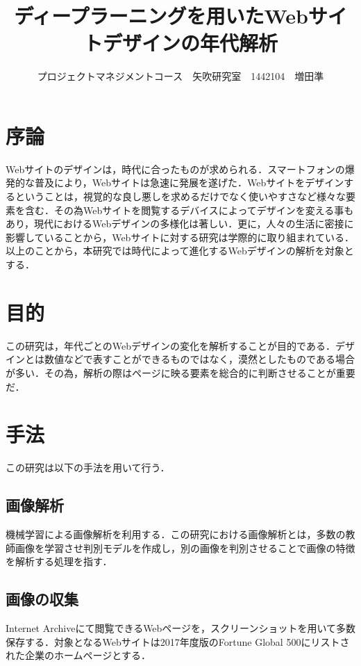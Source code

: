 \documentclass[uplatex,twocolumn,dvipdfmx]{jsarticle}
\title{\vspace{-5mm}\fontsize{14pt}{0pt}\selectfont ディープラーニングを用いたWebサイトデザインの年代解析}
\author{\normalsize プロジェクトマネジメントコース　矢吹研究室　1442104　増田準}
\date{}
\begin{document}
\fontsize{10.5pt}{\baselineskip}\selectfont
\maketitle





\section{序論}\label{序論}

Webサイトのデザインは，時代に合ったものが求められる\cite{bib001}．スマートフォンの爆発的な普及により，Webサイトは急速に発展を遂げた．Webサイトをデザインするということは，視覚的な良し悪しを求めるだけでなく使いやすさなど様々な要素を含む．その為Webサイトを閲覧するデバイスによってデザインを変える事もあり，現代におけるWebデザインの多様化は著しい．更に，人々の生活に密接に影響していることから，Webサイトに対する研究は学際的に取り組まれている\cite{bib002}．以上のことから，本研究では時代によって進化するWebデザインの解析を対象とする．

\section{目的}

この研究は，年代ごとのWebデザインの変化を解析することが目的である．デザインとは数値などで表すことができるものではなく，漠然としたものである場合が多い．その為，解析の際はページに映る要素を総合的に判断させることが重要だ．

\section{手法}

この研究は以下の手法を用いて行う． 

\subsection{画像解析}

機械学習による画像解析を利用する．この研究における画像解析とは，多数の教師画像を学習させ判別モデルを作成し，別の画像を判別させることで画像の特徴を解析する処理を指す．

\subsection{画像の収集}

Internet Archiveにて閲覧できるWebページを，スクリーンショットを用いて多数保存する．対象となるWebサイトは2017年度版のFortune Global 500\cite{bib003}にリストされた企業のホームページとする． 
\end{document}
